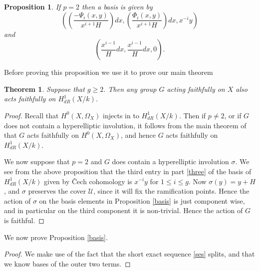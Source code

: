 \documentclass[draft, 11pt]{article} %
\theoremstyle{plain}
\newtheorem{thm}[defn]{Theorem}
\newtheorem{prop}[defn]{Proposition}
\theoremstyle{remark}
\newcommand{\cech}{\v{C}ech }
\begin{document}
{\begin{prop}
If $p=2$ then a basis is given by
\begin{equation}\label{three}
\left( \left(\frac{-\Psi_i(x,y)}{x^{i+1}H}\right) dx, \left( \frac{\Phi_i(x,y)}{x^{i+1}H} \right) dx, x^{-i}y \right)
\end{equation}
and
\begin{equation}\label{four}
 \left( \frac{x^{i-1}}{H} dx, \frac{x^{i-1}}{H} dx, 0 \right).
\end{equation}

\end{prop}

Before proving this proposition we use it to prove our main theorem\\


\begin{thm}

Suppose that $g \geq 2$.
Then any group $G$ acting faithfully on $X$ also acts faithfully on $H^1_{dR}(X/k)$.

\end{thm}
\begin{proof}

Recall that $H^0(X,\Omega_X)$ injects in to $H^1_{dR}(X/k)$.
Then if $p \neq 2$, or if $G$ does not contain a hyperelliptic involution, it follows from the main theorem of \cite{faithfulaction} that $G$ acts faithfully on $H^0(X,\Omega_X)$, and hence $G$ acts faithfully on $H^1_{dR}(X/k)$.

We now suppose that $p=2$ and $G$ does contain a hyperelliptic involution $\sigma$.
We see from the above proposition that the third entry in part \eqref{three} of the basis of $H^1_{dR}(X/k)$ given by \cech cohomology is $x^{-i}y$ for $1 \leq i \leq g$.
Now $\sigma(y) = y+ H$, and $\sigma$ preserves the cover $\mathcal U$, since it will fix the ramification points.
Hence the action of $\sigma$ on the basis elements in Proposition \ref{basis} is just component wise, and in particular on the third component it is non-trivial.
Hence the action of $G$ is faithful.


\end{proof}


We now prove Proposition \ref{basis}.

\begin{proof}
We make use of the fact that the short exact sequence \eqref{ses} splits, and that we know bases of the outer two terms.


\end{proof}}
\end{document}
